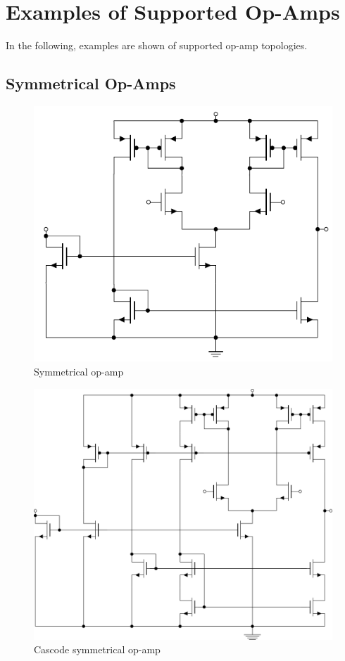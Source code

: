 \chapter{Examples of Supported Op-Amps}\label{app:ExampleOpAmps}
In the following, examples are shown of supported op-amp topologies.

\section{Symmetrical Op-Amps}

\begin{figure}[H]
	\centering
	\includegraphics[width=0.65\linewidth]{Fig/SymmetricalOpAmp}
	\caption{Symmetrical op-amp} \label{fig:SymmetricalOpAmp}
\end{figure}

\begin{figure}[H]
	\centering
	\includegraphics[width=\linewidth]{Fig/CascodeSymmetricalOTA.png}
	\caption{Cascode symmetrical op-amp} \label{fig:cascodeSymmetricalOpAmp}
\end{figure}

